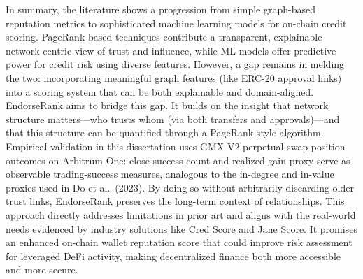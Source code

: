 In summary, the literature shows a progression from simple graph-based reputation metrics to sophisticated machine learning models for on-chain credit scoring. PageRank-based techniques contribute a transparent, explainable network-centric view of trust and influence, while ML models offer predictive power for credit risk using diverse features. However, a gap remains in melding the two: incorporating meaningful graph features (like ERC-20 approval links) into a scoring system that can be both explainable and domain-aligned. EndorseRank aims to bridge this gap. It builds on the insight that network structure matters---who trusts whom (via both transfers and approvals)---and that this structure can be quantified through a PageRank-style algorithm. Empirical validation in this dissertation uses GMX V2 perpetual swap position outcomes on Arbitrum One: close-success count and realized gain proxy serve as observable trading-success measures, analogous to the in-degree and in-value proxies used in Do et al.\ (2023). By doing so without arbitrarily discarding older trust links, EndorseRank preserves the long-term context of relationships. This approach directly addresses limitations in prior art and aligns with the real-world needs evidenced by industry solutions like Cred Score and Jane Score. It promises an enhanced on-chain wallet reputation score that could improve risk assessment for leveraged DeFi activity, making decentralized finance both more accessible and more secure.
